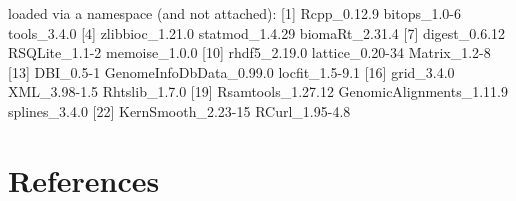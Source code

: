 \documentclass[12pt]{report}
\renewenvironment{Schunk}{\vspace{0pt}}{\vspace{0pt}}
\begin{document}
\begin{Schunk}
\begin{Soutput}
loaded via a namespace (and not attached):
 [1] Rcpp_0.12.9              bitops_1.0-6             tools_3.4.0             
 [4] zlibbioc_1.21.0          statmod_1.4.29           biomaRt_2.31.4          
 [7] digest_0.6.12            RSQLite_1.1-2            memoise_1.0.0           
[10] rhdf5_2.19.0             lattice_0.20-34          Matrix_1.2-8            
[13] DBI_0.5-1                GenomeInfoDbData_0.99.0  locfit_1.5-9.1          
[16] grid_3.4.0               XML_3.98-1.5             Rhtslib_1.7.0           
[19] Rsamtools_1.27.12        GenomicAlignments_1.11.9 splines_3.4.0           
[22] KernSmooth_2.23-15       RCurl_1.95-4.8          
\end{Soutput}
\end{Schunk}

\section{References}


\end{document}
